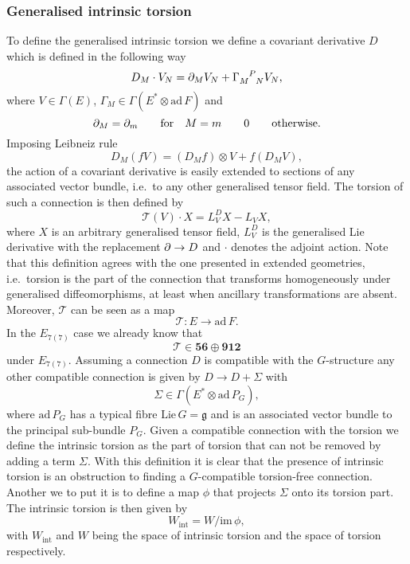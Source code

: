 \subsubsection{Generalised intrinsic torsion}
To define the generalised intrinsic torsion we define a covariant derivative $D$ which is defined in the following way 
\begin{equation}
    D_M\cdot V_N = \pd_MV_N+\tensor{\Gamma}{_M^P_N}V_N,
\end{equation}
where $V\in\Gamma(E)$, $\Gamma_M\in\Gamma(E^*\otimes \text{ad}\,F)$ and 
\begin{equation}
    \partial_M = \partial_m \qquad \text{for} \quad M=m\qquad 0\qquad \text{otherwise}.
\end{equation}
Imposing Leibneiz rule 
\begin{equation}
    D_M(fV) = (D_Mf)\otimes V+f(D_MV),
\end{equation}
the action of a covariant derivative is easily extended to sections of any associated vector bundle, i.e.\ to any other generalised tensor field. The torsion of such a connection is then defined by 
\begin{equation}
    \mathscr{T}(V)\cdot X = L_V^D X-L_V X,
\end{equation}
where $X$ is an arbitrary generalised tensor field, $L_V^D$ is the generalised Lie derivative with the replacement $\partial\to D$ and $\cdot$ denotes the adjoint action. Note that this definition agrees with the one presented in extended geometries, i.e.\ torsion is the part of the connection that transforms homogeneously under generalised diffeomorphisms, at least when ancillary transformations are absent. Moreover, $\mathscr{T}$ can be seen as a map
\begin{equation}
    \mathscr{T}: E\to \text{ad}\, F. 
\end{equation}
In the $E_{7(7)}$ case we already know that 
\begin{equation}
    \mathscr{T}\in \mathbf{56}\oplus\mathbf{912}
\end{equation}
under $E_{7(7)}$. Assuming a connection $D$ is compatible with the $G$-structure any other compatible connection is given by $D\to D+\Sigma$ with 
\begin{equation}
    \Sigma \in \Gamma(E^*\otimes \text{ad}\,P_G),
\end{equation}
where $\text{ad}\,P_G$ has a typical fibre $\text{Lie}\,G=\mathfrak{g}$ and is an associated vector bundle to the principal sub-bundle $P_G$. Given a compatible connection with the torsion we define the intrinsic torsion as the part of torsion that can not be removed by adding a term $\Sigma$. With this definition it is clear that the presence of intrinsic torsion is an obstruction to finding a $G$-compatible torsion-free connection. Another we to put it is to define a map $\phi$ that projects $\Sigma$ onto its torsion part. The intrinsic torsion is then given by 
\begin{equation}
    W_{\text{int}} = W/\text{im}\,\phi,
\end{equation}
with $W_{\text{int}}$ and $W$ being the space of intrinsic torsion and the space of torsion respectively. 

